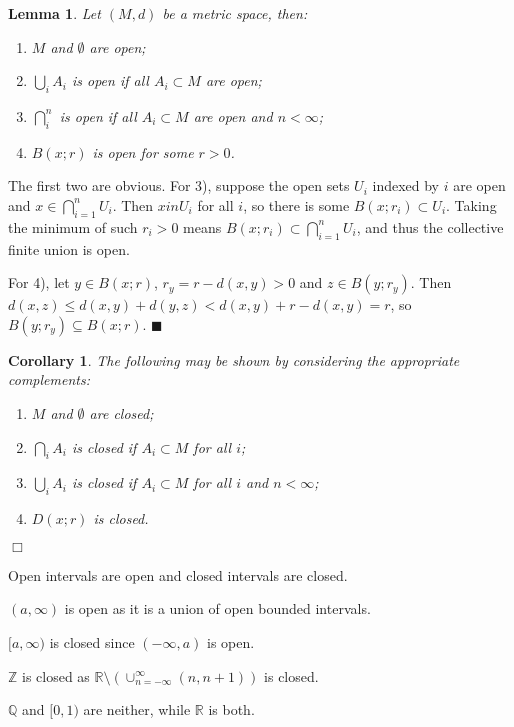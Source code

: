 \documentclass[letter-paper]{tufte-book}
\newtheorem{lemma}[theorem]{\color{pastel-blue}Lemma}
\newtheorem{corollary}[theorem]{\color{pastel-blue}Corollary}
\newenvironment{proof}[1][Proof]{\begin{trivlist}
\item[\hskip \labelsep {\bfseries #1}]}{\end{trivlist}}
\newenvironment{example}[1][Example]{\begin{trivlist}
\item[\hskip \labelsep {\bfseries #1}]}{\end{trivlist}}
\newcommand{\qed}{\hfill$\blacksquare$}
\newcommand{\qedwhite}{\hfill \ensuremath{\Box}}
\begin{document}
\begin{lemma}
Let $(M, d)$ be a metric space, then:
  \begin{enumerate}
    \item $M$ and $\emptyset$ are open;
    \item $\bigcup_i A_i$ is open if all $A_i \subset M$ are open;
    \item $\bigcap_i^n$ is open if all $A_i \subset M$ are open and $n <
    \infty$;
    \item $B(x; r)$ is open for some $r > 0$.
  \end{enumerate}
\end{lemma}

\begin{proof}
  The first two are obvious. For 3), suppose the open sets $U_i$ indexed by $i$
  are open and $x \in \bigcap_{i=1}^n U_i$. Then $x in U_i$ for all $i$, so
  there is some $B(x; r_i) \subset U_i$. Taking the minimum of such $r_i > 0$
  means $B(x; r_i) \subset \bigcap_{i=1}^n U_i$, and thus the collective
  finite union is open.
  
  For 4), let $y \in B(x; r)$, $r_y = r - d(x, y) > 0$ and $z \in
  B(y; r_y)$. Then $d(x, z) \leq d(x, y) + d(y, z) < d(x, y) +
  r - d(x, y) = r$, so $B(y; r_y) \subseteq B(x; r)$. \qed
\end{proof}

\begin{corollary}
The following may be shown by considering the appropriate complements:
  \begin{enumerate}
    \item $M$ and $\emptyset$ are closed;
    \item $\bigcap_i A_i$ is closed if $A_i \subset M$ for all $i$;
    \item $\bigcup_i A_i$ is closed if $A_i \subset M$ for all $i$ and $n <
    \infty$;
    \item $D(x; r)$ is closed.
  \end{enumerate}
  \qedwhite
\end{corollary}

\begin{example}
  Open intervals are open and closed intervals are closed.
  
  $(a, \infty)$ is open as it is a union of open bounded intervals.
  
  $[a, \infty)$ is closed since $(-\infty, a)$ is open.
  
  $\mathbb{Z}$ is closed as $\mathbb{R} \setminus \left(\cup_{n=-\infty}^\infty
  (n, n+1)\right)$ is closed.
  
  $\mathbb{Q}$ and $[0, 1)$ are neither, while $\mathbb{R}$ is both.
\end{example}
\end{document}
